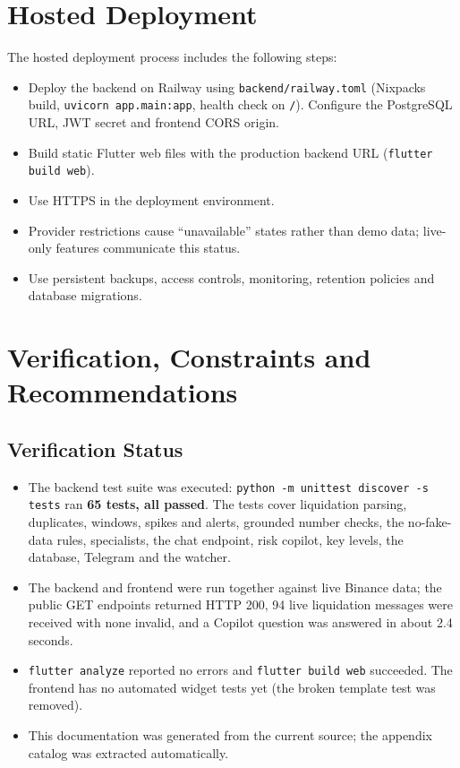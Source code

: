 \section{Hosted Deployment}
The hosted deployment process includes the following steps:
\begin{itemize}
\item Deploy the backend on Railway using \texttt{backend/railway.toml} (Nixpacks build, \texttt{uvicorn app.main:app}, health check on \texttt{/}). Configure the PostgreSQL URL, JWT secret and frontend CORS origin.
\item Build static Flutter web files with the production backend URL (\texttt{flutter build web}).
\item Use HTTPS in the deployment environment.
\item Provider restrictions cause ``unavailable'' states rather than demo data; live-only features communicate this status.
\item Use persistent backups, access controls, monitoring, retention policies and database migrations.
\end{itemize}

\section{Verification, Constraints and Recommendations}
\subsection{Verification Status}
\begin{itemize}
\item The backend test suite was executed: \texttt{python -m unittest discover -s tests} ran \textbf{65 tests, all passed}. The tests cover liquidation parsing, duplicates, windows, spikes and alerts, grounded number checks, the no-fake-data rules, specialists, the chat endpoint, risk copilot, key levels, the database, Telegram and the watcher.
\item The backend and frontend were run together against live Binance data; the public GET endpoints returned HTTP 200, 94 live liquidation messages were received with none invalid, and a Copilot question was answered in about 2.4 seconds.
\item \texttt{flutter analyze} reported no errors and \texttt{flutter build web} succeeded. The frontend has no automated widget tests yet (the broken template test was removed).
\item This documentation was generated from the current source; the appendix catalog was extracted automatically.
\end{itemize}

